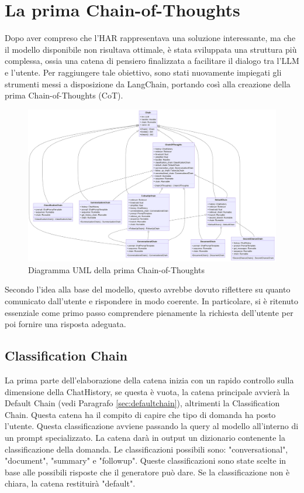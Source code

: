 \section{La prima Chain-of-Thoughts}
Dopo aver compreso che l'HAR rappresentava una soluzione interessante, ma che il modello disponibile non risultava ottimale, è stata sviluppata una struttura più complessa, ossia una catena di pensiero finalizzata a facilitare il dialogo tra l'LLM e l'utente. Per raggiungere tale obiettivo, sono stati nuovamente impiegati gli strumenti messi a disposizione da LangChain, portando così alla creazione della prima Chain-of-Thoughts (CoT).
\begin{figure}[!t]
    \centering
    \includegraphics[width=\textwidth]{Images/cap4/schema1.png}
    \caption{Diagramma UML della prima Chain-of-Thoughts}
    \label{fig:uml1}
\end{figure}
Secondo l'idea alla base del modello, questo avrebbe dovuto riflettere su quanto comunicato dall'utente e rispondere in modo coerente. In particolare, si è ritenuto essenziale come primo passo comprendere pienamente la richiesta dell'utente per poi fornire una risposta adeguata.

\subsection{Classification Chain}
La prima parte dell'elaborazione della catena inizia con un rapido controllo sulla dimensione della ChatHistory, se questa è vuota, la catena principale avvierà la Default Chain (vedi Paragrafo \ref{sec:defaultchain}), altrimenti la Classification Chain. Questa catena ha il compito di capire che tipo di domanda ha posto l'utente.
Questa classificazione avviene passando la query al modello all'interno di un prompt specializzato. La catena darà in output un dizionario contenente la classificazione della domanda. Le classificazioni possibili sono: "conversational", "document", "summary" e "followup". Queste classificazioni sono state scelte in base alle possibili risposte che il generatore può dare. Se la classificazione non è chiara, la catena restituirà "default".

